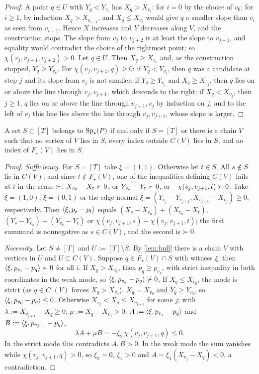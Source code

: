 \begin{proof}
A point $q\in U$ with $Y_q<Y_{v_i}$ has $X_q>X_{v_i}$: for $i=0$ by the choice of $v_0$; for $i\ge1$, by induction $X_q>X_{v_{i-1}}$, and $X_q\le X_{v_i}$ would give $q$ a smaller slope than $v_i$ as seen from $v_{i-1}$. Hence $X$ increases and $Y$ decreases along $V$, and the construction stops. The slope from $v_j$ to $v_{j+2}$ is at least the slope to $v_{j+1}$, and equality would contradict the choice of the rightmost point; so $\chi(v_j,v_{j+1},v_{j+2})>0$. Let $q\in U$. Then $X_q\ge X_{v_0}$ and, as the construction stopped, $Y_q\ge Y_{v_k}$. For $\chi(v_j,v_{j+1},q)\ge0$: if $Y_q<Y_{v_j}$, then $q$ was a candidate at step $j$ and its slope from $v_j$ is not smaller; if $Y_q\ge Y_{v_j}$ and $X_q\ge X_{v_j}$, then $q$ lies on or above the line through $v_j,v_{j+1}$, which descends to the right; if $X_q<X_{v_j}$, then $j\ge1$, $q$ lies on or above the line through $v_{j-1},v_j$ by induction on $j$, and to the left of $v_j$ this line lies above the line through $v_j,v_{j+1}$, whose slope is larger.
\end{proof}

\begin{theorem}[chains]\label{thm:chain}
A set $S\subset[T]$ belongs to $\operatorname{Sp}_\star(P)$ if and only if $S=[T]$ or there is a chain $V$ such that no vertex of $V$ lies in $S$, every index outside $C(V)$ lies in $S$, and no index of $F_\star(V)$ lies in $S$.
\end{theorem}

\begin{proof}
\emph{Sufficiency.} For $S=[T]$ take $\xi=(1,1)$. Otherwise let $t\in S$. All $s\notin S$ lie in $C(V)$, and since $t\notin F_\star(V)$, one of the inequalities defining $C(V)$ fails at $t$ in the sense $\mathrel{\succ}$: $X_{v_0}-X_t\mathrel{\succ}0$, or $Y_{v_k}-Y_t\mathrel{\succ}0$, or $-\chi(v_j,v_{j+1},t)\mathrel{\succ}0$. Take $\xi=(1,0)$, $\xi=(0,1)$ or the edge normal $\xi=(Y_{v_j}-Y_{v_{j+1}},X_{v_{j+1}}-X_{v_j})\ge0$, respectively. Then $\langle \xi, p_s-p_t\rangle$ equals $(X_s-X_{v_0})+(X_{v_0}-X_t)$, $(Y_s-Y_{v_k})+(Y_{v_k}-Y_t)$ or $\chi(v_j,v_{j+1},s)-\chi(v_j,v_{j+1},t)$; the first summand is nonnegative as $s\in C(V)$, and the second is $\mathrel{\succ}0$.

\emph{Necessity.} Let $S\ne[T]$ and $U:=[T]\setminus S$. By \cref{lem:hull} there is a chain $V$ with vertices in $U$ and $U\subset C(V)$. Suppose $q\in F_\star(V)\cap S$ with witness $\xi$; then $\langle \xi, p_{v_i}-p_q\rangle\mathrel{\succ}0$ for all $i$. If $X_q>X_{v_k}$, then $p_q\ge p_{v_k}$, with strict inequality in both coordinates in the weak mode, so $\langle \xi, p_{v_k}-p_q\rangle\mathrel{\not\succ}0$. If $X_q\le X_{v_0}$, the mode is strict (as $q\in C^\circ(V)$ forces $X_q>X_{v_0}$), $X_q=X_{v_0}$ and $Y_q\ge Y_{v_0}$, so $\langle \xi, p_{v_0}-p_q\rangle\le0$. Otherwise $X_{v_j}<X_q\le X_{v_{j+1}}$ for some $j$; with $\lambda:=X_{v_{j+1}}-X_q\ge0$, $\mu:=X_q-X_{v_j}>0$, $A:=\langle \xi, p_{v_j}-p_q\rangle$ and $B:=\langle \xi, p_{v_{j+1}}-p_q\rangle$,
\[
\lambda A+\mu B=-\xi_2\,\chi(v_j,v_{j+1},q)\le0 .
\]
In the strict mode this contradicts $A,B>0$. In the weak mode the sum vanishes while $\chi(v_j,v_{j+1},q)>0$, so $\xi_2=0$, $\xi_1>0$ and $A=\xi_1(X_{v_j}-X_q)<0$, a contradiction.
\end{proof}

